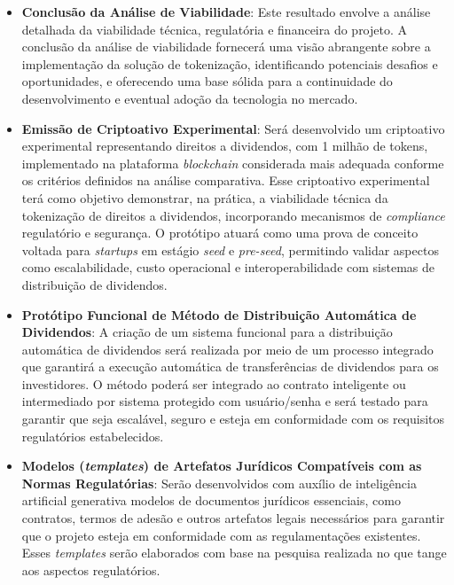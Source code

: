 \documentclass[12pt, a4paper, oneside, openright, chapter=TITLE]{abntex2}
\begin{document}
\begin{itemize}
    \item \textbf{Conclusão da Análise de Viabilidade}:
    Este resultado envolve a análise detalhada da viabilidade técnica, regulatória e financeira do projeto. A conclusão da análise de viabilidade fornecerá uma visão abrangente sobre a implementação da solução de tokenização, identificando potenciais desafios e oportunidades, e oferecendo uma base sólida para a continuidade do desenvolvimento e eventual adoção da tecnologia no mercado.

    \item \textbf{Emissão de Criptoativo Experimental}:
    Será desenvolvido um criptoativo experimental representando direitos a dividendos, com 1 milhão de tokens, implementado na plataforma \textit{blockchain} considerada mais adequada conforme os critérios definidos na análise comparativa. Esse criptoativo experimental terá como objetivo demonstrar, na prática, a viabilidade técnica da tokenização de direitos a dividendos, incorporando mecanismos de \textit{compliance} regulatório e segurança. O protótipo atuará como uma prova de conceito voltada para \textit{startups} em estágio \textit{seed} e \textit{pre-seed}, permitindo validar aspectos como escalabilidade, custo operacional e interoperabilidade com sistemas de distribuição de dividendos.

    \item \textbf{Protótipo Funcional de Método de Distribuição Automática de Dividendos}:
    A criação de um sistema funcional para a distribuição automática de dividendos será realizada por meio de um processo integrado que garantirá a execução automática de transferências de dividendos para os investidores. O método poderá ser integrado ao contrato inteligente ou intermediado por sistema protegido com usuário/senha e será testado para garantir que seja escalável, seguro e esteja em conformidade com os requisitos regulatórios estabelecidos.

    \item \textbf{Modelos (\textit{templates}) de Artefatos Jurídicos Compatíveis com as Normas Regulatórias}:
    Serão desenvolvidos com auxílio de inteligência artificial generativa modelos de documentos jurídicos essenciais, como contratos, termos de adesão e outros artefatos legais necessários para garantir que o projeto esteja em conformidade com as regulamentações existentes. Esses \textit{templates} serão elaborados com base na pesquisa realizada no que tange aos aspectos regulatórios.
\end{itemize}
\end{document}
